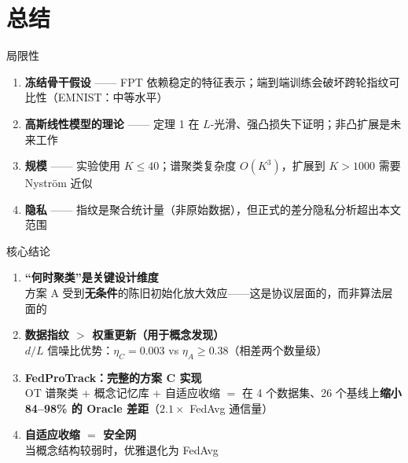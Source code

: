 \documentclass[aspectratio=169,11pt]{ctexbeamer}
\begin{document}
\section{总结}

\begin{frame}{局限性}

\begin{enumerate}\setlength\itemsep{4pt}
  \item \textbf{冻结骨干假设} ——
    FPT 依赖稳定的特征表示；端到端训练会破坏跨轮指纹可比性（EMNIST：中等水平）

  \item \textbf{高斯线性模型的理论} ——
    定理 1 在 $L$-光滑、强凸损失下证明；非凸扩展是未来工作

  \item \textbf{规模} ——
    实验使用 $K \leq 40$；谱聚类复杂度 $O(K^3)$，扩展到 $K > 1000$ 需要 Nystr\"{o}m 近似

  \item \textbf{隐私} ——
    指纹是聚合统计量（非原始数据），但正式的差分隐私分析超出本文范围
\end{enumerate}
\end{frame}

\begin{frame}{核心结论}

\begin{enumerate}\setlength\itemsep{4pt}
  \item \textbf{``何时聚类''是关键设计维度}\\
    方案 A 受到\textbf{无条件}的陈旧初始化放大效应——这是协议层面的，而非算法层面的

  \item \textbf{数据指纹 $>$ 权重更新（用于概念发现）}\\
    $d/L$ 信噪比优势：$\eta_C = 0.003$ vs $\eta_A \geq 0.38$（相差两个数量级）

  \item \textbf{FedProTrack：完整的方案 C 实现}\\
    OT 谱聚类 + 概念记忆库 + 自适应收缩 $=$ 在 4 个数据集、26 个基线上\textbf{缩小 84--98\% 的 Oracle 差距}（$2.1\times$ FedAvg 通信量）

  \item \textbf{自适应收缩 $=$ 安全网}\\
    当概念结构较弱时，优雅退化为 FedAvg
\end{enumerate}
\end{frame}
\end{document}
